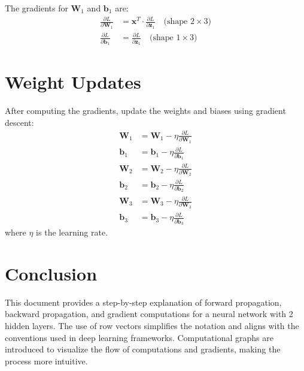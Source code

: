 \begin{notechapter}
\begin{center}
\end{center}

The gradients for \(\bm{W}_1\) and \(\bm{b}_1\) are:
\begin{align*}
    \frac{\partial L}{\partial \bm{W}_1} &= \bm{x}^T \cdot
    \frac{\partial L}{\partial \bm{z}_1} \quad
    \text{(shape } 2 \times 3\text{)} \\
    \frac{\partial L}{\partial \bm{b}_1} &= \frac{\partial L}{\partial \bm{z}_1}
    \quad \text{(shape } 1 \times 3\text{)}
\end{align*}

\section{Weight Updates}
After computing the gradients, update the weights and biases using
gradient descent:
\begin{align*}
    \bm{W}_1 &= \bm{W}_1 - \eta \frac{\partial L}{\partial \bm{W}_1} \\
    \bm{b}_1 &= \bm{b}_1 - \eta \frac{\partial L}{\partial \bm{b}_1} \\
    \bm{W}_2 &= \bm{W}_2 - \eta \frac{\partial L}{\partial \bm{W}_2} \\
    \bm{b}_2 &= \bm{b}_2 - \eta \frac{\partial L}{\partial \bm{b}_2} \\
    \bm{W}_3 &= \bm{W}_3 - \eta \frac{\partial L}{\partial \bm{W}_3} \\
    \bm{b}_3 &= \bm{b}_3 - \eta \frac{\partial L}{\partial \bm{b}_3}
\end{align*}
where \(\eta\) is the learning rate.

\section{Conclusion}
This document provides a step-by-step explanation of forward
propagation, backward propagation, and gradient computations for a
neural network with 2 hidden layers. The use of row vectors simplifies
the notation and aligns with the conventions used in deep learning
frameworks. Computational graphs are introduced to visualize the flow
of computations and gradients, making the process more intuitive.
\end{notechapter}
